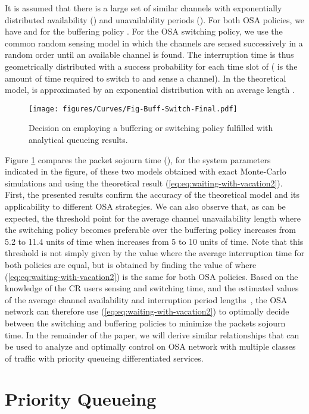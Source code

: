 \documentclass[11pt,journal,oneside,onecolumn,draftclsnofoot]{IEEEtran}
\begin{document}
It is assumed that there is a large set of similar channels with exponentially distributed availability () and unavailability periods (). For both OSA policies, we have  and for the buffering policy  \cite{azarfar12e}. For the OSA switching policy, we use the common random sensing model in which the channels are sensed successively in a random order until an available channel is found. The interruption time  is thus geometrically distributed with a success probability  for each time slot of  ( is the amount of time required to switch to and sense a channel). In the theoretical model,  is approximated by an exponential distribution with an average length .
\begin{figure}\texttt{[image: figures/Curves/Fig-Buff-Switch-Final.pdf]}\caption{Decision on employing a buffering or switching policy fulfilled with analytical queueing results.}\label{Fig-Buff-Switch-Final}\end{figure}

Figure \ref{Fig-Buff-Switch-Final} compares the packet sojourn time (), for the system parameters indicated in the figure, of these two models obtained with exact Monte-Carlo simulations and using the theoretical result (\ref{eq:eq:waiting-with-vacation2}). First, the presented results confirm the accuracy of the theoretical model and its applicability to different OSA strategies. We can also observe that, as can be expected, the threshold point for the average channel unavailability length  where the switching policy becomes preferable over the buffering policy increases from 5.2 to 11.4 units of time when  increases from 5 to 10 units of time. Note that this threshold is not simply given by the value  where the average interruption time for both policies are equal, but is obtained by finding the value of  where (\ref{eq:eq:waiting-with-vacation2}) is the same for both OSA policies. Based on the knowledge of the CR users sensing and switching time, and the estimated values of the average channel availability and interruption period lengths~\cite{gab13}, the OSA network can therefore use (\ref{eq:eq:waiting-with-vacation2}) to optimally decide between the switching and buffering policies to minimize the packets sojourn time.
In the remainder of the paper, we will derive similar relationships that can be used to analyze and optimally control on OSA network with multiple classes of traffic with priority queueing differentiated services. 

\section{Priority Queueing}
\label{sec:pr-queueing}
\end{document}
